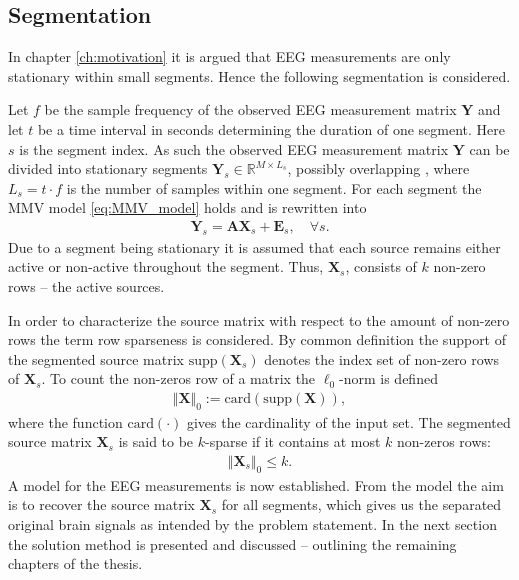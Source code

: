 \subsection{Segmentation}\label{seg_segmentation}
In chapter \ref{ch:motivation} it is argued that EEG measurements are only stationary within small segments. 
Hence the following segmentation is considered.

Let $f$ be the sample frequency of the observed EEG measurement matrix $\mathbf{Y}$ and let $t$ be a time interval in seconds determining the duration of one segment. 
Here $s$ is the segment index. 
As such the observed EEG measurement matrix $\mathbf{Y}$ can be divided into stationary segments  $\mathbf{Y}_s \in \mathbb{R}^{M \times L_{s}}$, possibly overlapping , where $L_s = t \cdot f$ is the number of samples within one segment. 
For each segment the MMV model \eqref{eq:MMV_model} holds and is rewritten into 
\begin{align}\label{eq:MMV_seg}
\mathbf{Y}_s = \mathbf{AX}_s + \textbf{E}_s, \quad \forall s.
\end{align}
Due to a segment being stationary it is assumed that each source remains either active or non-active throughout the segment.
Thus, $\mathbf{X}_s$, consists of $k$ non-zero rows -- the active sources.

In order to characterize the source matrix with respect to the amount of non-zero rows the term row sparseness is considered.  
By common definition the support of the segmented source matrix $\text{supp}(\mathbf{X}_s)$ denotes the index set of non-zero rows of $\mathbf{X}_s$.
To count the non-zeros row of a matrix the $\ell_0$-norm is defined 
\begin{align*}
\Vert \mathbf{X} \Vert_0 := \text{card}(\text{supp}(\mathbf{X})),
\end{align*}
where the function $\text{card}(\cdot)$ gives the cardinality of the input set. The segmented source matrix $\textbf{X}_s$ is said to be $k$-sparse if it contains at most $k$ non-zeros rows:
\begin{align*}
\Vert \mathbf{X}_s \Vert_0 \leq k.
\end{align*}
A model for the EEG measurements is now established.
From the model the aim is to recover the source matrix $\mathbf{X}_s$ for all segments, which gives us the separated original brain signals as intended by the problem statement.      
In the next section the solution method is presented and discussed -- outlining the remaining chapters of the thesis.    

